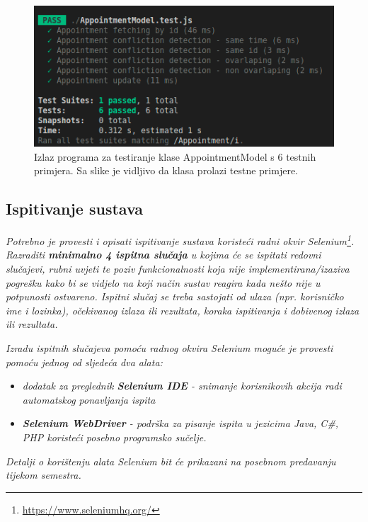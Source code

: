                 \begin{figure}[H]
                    \includegraphics[width=\textwidth]{slike/appointment_tests_out.png} %
                    \caption{Izlaz programa za testiranje klase AppointmentModel s 6 testnih primjera. Sa slike je vidljivo da klasa prolazi testne primjere.}
                    \label{fig:struktura} %
                \end{figure}
			
			
			
			\subsection{Ispitivanje sustava}
			
			 \textit{Potrebno je provesti i opisati ispitivanje sustava koristeći radni okvir Selenium\footnote{\url{https://www.seleniumhq.org/}}. Razraditi \textbf{minimalno 4 ispitna slučaja} u kojima će se ispitati redovni slučajevi, rubni uvjeti te poziv funkcionalnosti koja nije implementirana/izaziva pogrešku kako bi se vidjelo na koji način sustav reagira kada nešto nije u potpunosti ostvareno. Ispitni slučaj se treba sastojati od ulaza (npr. korisničko ime i lozinka), očekivanog izlaza ili rezultata, koraka ispitivanja i dobivenog izlaza ili rezultata.\\ }
			 
			 \textit{Izradu ispitnih slučajeva pomoću radnog okvira Selenium moguće je provesti pomoću jednog od sljedeća dva alata:}
			 \begin{itemize}
			 	\item \textit{dodatak za preglednik \textbf{Selenium IDE} - snimanje korisnikovih akcija radi automatskog ponavljanja ispita	}
			 	\item \textit{\textbf{Selenium WebDriver} - podrška za pisanje ispita u jezicima Java, C\#, PHP koristeći posebno programsko sučelje.}
			 \end{itemize}
		 	\textit{Detalji o korištenju alata Selenium bit će prikazani na posebnom predavanju tijekom semestra.}
			
